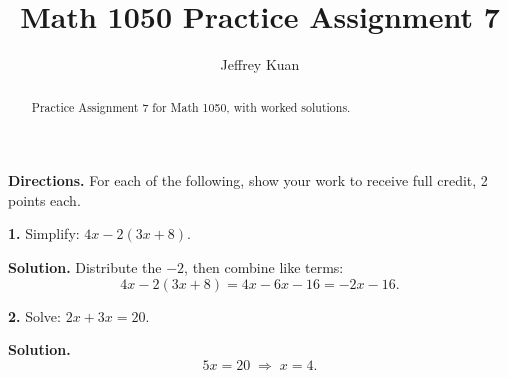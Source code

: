 \documentclass{ximera}
\author{Jeffrey Kuan}
\title{Math 1050 Practice Assignment 7}
\begin{document}
\begin{abstract}
    Practice Assignment 7 for Math 1050, with worked solutions.
\end{abstract}

\maketitle

\textbf{Directions.} For each of the following, show your work to receive full credit,
2 points each.

\begin{problem}

\textbf{1.} Simplify: $4x-2(3x+8)$.

\begin{hint}
\textbf{Solution.} Distribute the $-2$, then combine like terms:
\[
  4x-2(3x+8) = 4x-6x-16 = -2x-16 .
\]
\end{hint}
\end{problem}

\begin{problem}

\textbf{2.} Solve: $2x+3x=20$.

\begin{hint}
\textbf{Solution.}
\[
  5x=20 \;\Longrightarrow\; x=4 .
\]
\end{hint}
\end{problem}
\end{document}

